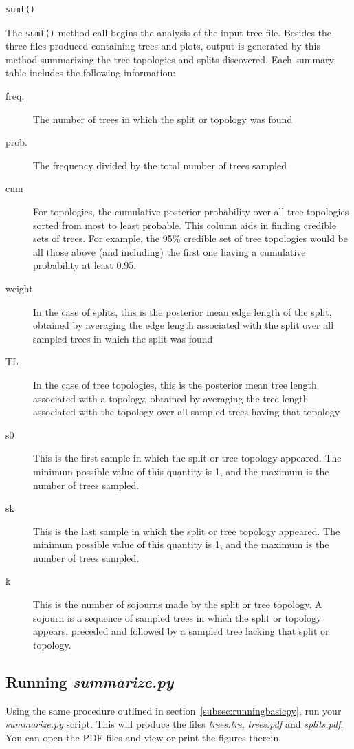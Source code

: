 \documentclass[10pt]{article}
\newcommand{\pathname}[1]{{\em #1}}				%
\begin{document}
\begin{samepage}
\begin{verbatim}
sumt()
\end{verbatim}
The {\tt sumt()} method call begins the analysis of the input tree file. Besides the three files produced containing trees and plots, output is generated by this method summarizing the tree topologies and splits discovered. Each summary table includes the following information:
\end{samepage}
\begin{description}
\item[freq.] The number of trees in which the split or topology was found
\item[prob.] The frequency divided by the total number of trees sampled
\item[cum] For topologies, the cumulative posterior probability over all tree topologies sorted from most to least probable. This column aids in finding credible sets of trees. For example, the 95\% credible set of tree topologies would be all those above (and including) the first one having a cumulative probability at least 0.95.
\item[weight] In the case of splits, this is the posterior mean edge length of the split, obtained by averaging the edge length associated with the split over all sampled trees in which the split was found
\item[TL] In the case of tree topologies, this is the posterior mean tree length associated with a topology, obtained by averaging the tree length associated with the topology over all sampled trees having that topology
\item[s0] This is the first sample in which the split or tree topology appeared. The minimum possible value of this quantity is 1, and the maximum is the number of trees sampled.
\item[sk] This is the last sample in which the split or tree topology appeared. The minimum possible value of this quantity is 1, and the maximum is the number of trees sampled.
\item[k] This is the number of sojourns made by the split or tree topology. A sojourn is a sequence of sampled trees in which the split or topology appears, preceded and followed by a sampled tree lacking that split or topology.
\end{description}

\subsection{Running \pathname{summarize.py}}
Using the same procedure outlined in section~\ref{subsec:runningbasicpy}, run your \pathname{summarize.py} script. This will produce the files \pathname{trees.tre}, \pathname{trees.pdf} and \pathname{splits.pdf}. You can open the PDF files and view or print the figures therein.
\end{document}
